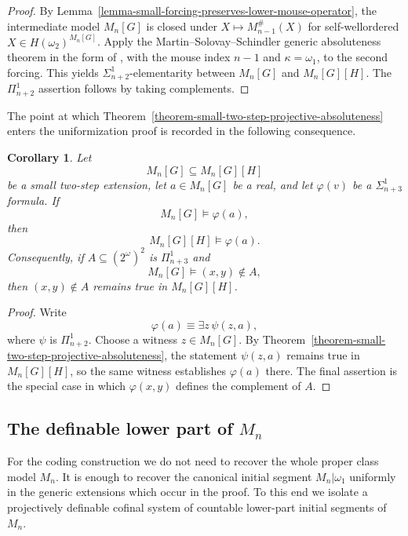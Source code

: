 \documentclass[a4paper,11pt]{article}
\newtheorem{corollary}[theorem]{Corollary}
\begin{document}
\begin{proof}
By Lemma~\ref{lemma-small-forcing-preserves-lower-mouse-operator}, the
intermediate model $M_n[G]$ is closed under
$X\mapsto M_{n-1}^{\#}(X)$ for self-wellordered
$X\in H(\omega_2)^{M_n[G]}$.  Apply the Martin--Solovay--Schindler generic
absoluteness theorem in the form of \cite[Lemma~3.7]{Schlicht}, with the mouse
index $n-1$ and $\kappa=\omega_1$, to the second forcing.  This yields
$\Sigma^1_{n+2}$-elementarity between $M_n[G]$ and $M_n[G][H]$.  The
$\Pi^1_{n+2}$ assertion follows by taking complements.
\end{proof}

The point at which Theorem~\ref{theorem-small-two-step-projective-absoluteness}
enters the uniformization proof is recorded in the following consequence.

\begin{corollary}
\label{corollary-persistence-Sigma-n-plus-3-witnesses}
Let
\[
   M_n[G]\subseteq M_n[G][H]
\]
be a small two-step extension, let $a\in M_n[G]$ be a real, and let
$\varphi(v)$ be a $\Sigma^1_{n+3}$ formula.  If
\[
   M_n[G]\models\varphi(a),
\]
then
\[
   M_n[G][H]\models\varphi(a).
\]
Consequently, if $A\subseteq(2^\omega)^2$ is $\Pi^1_{n+3}$ and
\[
   M_n[G]\models (x,y)\notin A,
\]
then $(x,y)\notin A$ remains true in $M_n[G][H]$.
\end{corollary}

\begin{proof}
Write
\[
   \varphi(a)\equiv\exists z\,\psi(z,a),
\]
where $\psi$ is $\Pi^1_{n+2}$.  Choose a witness $z\in M_n[G]$.  By
Theorem~\ref{theorem-small-two-step-projective-absoluteness}, the statement
$\psi(z,a)$ remains true in $M_n[G][H]$, so the same witness establishes
$\varphi(a)$ there.  The final assertion is the special case in which
$\varphi(x,y)$ defines the complement of $A$.
\end{proof}


\subsection[The definable lower part of Mn]{The definable lower part of $M_n$}
\label{subsection-definable-lower-part-Mn}

For the coding construction we do not need to recover the whole proper class
model $M_n$.  It is enough to recover the canonical initial segment
$M_n|\omega_1$ uniformly in the generic extensions which occur in
the proof.  To this end we isolate a projectively definable cofinal system of
countable lower-part initial segments of $M_n$.
\end{document}
